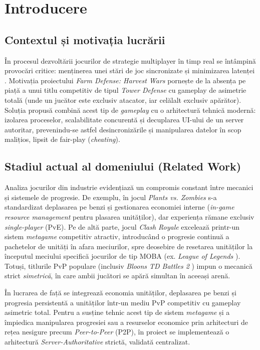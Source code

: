 \chapter{Introducere}
\label{ch:introducere}

\section{Contextul și motivația lucrării}
În procesul dezvoltării jocurilor de strategie multiplayer în timp real se întâmpină provocări critice: menținerea unei stări de joc sincronizate și minimizarea latenței \cite{glazer_multiplayer}. Motivația proiectului \textit{Farm Defense: Harvest Wars} pornește de la absența pe piață a unui titlu competitiv de tipul \textit{Tower Defense} cu gameplay de asimetrie totală (unde un jucător este exclusiv atacator, iar celălalt exclusiv apărător). Soluția propusă combină acest tip de \textit{gameplay} cu o arhitectură tehnică modernă: izolarea proceselor, scalabilitate concurentă și decuplarea UI-ului de un server autoritar, prevenindu-se astfel desincronizările și manipularea datelor în scop malițios, lipsit de fair-play (\textit{cheating}).

\section{Stadiul actual al domeniului (Related Work)}
Analiza jocurilor din industrie evidențiază un compromis constant între mecanici și sistemele de progresie. De exemplu, în jocul \textit{Plants vs. Zombies} \cite{pvz} s-a standardizat deplasarea pe benzi și gestionarea economiei interne (\textit{in-game resource management} pentru plasarea unităților), dar experiența rămane exclusiv \textit{single-player} (PvE). Pe de altă parte, jocul \textit{Clash Royale} \cite{clash_royale} excelează printr-un sistem \textit{metagame} competitiv atractiv, introducând o progresie continuă a pachetelor de unități în afara meciurilor, spre deosebire de resetarea unităților la începutul meciului specifică jocurilor de tip MOBA (ex. \textit{League of Legends} \cite{lol}). Totuși, titlurile PvP populare (inclusiv \textit{Bloons TD Battles 2} \cite{btdb2}) impun o mecanică strict \textit{simetrică}, în care ambii jucători se apără simultan în aceeași arenă.

În lucrarea de față se integrează economia unităților, deplasarea pe benzi și progresia persistentă a unităților într-un mediu PvP competitiv cu gameplay asimetric total. Pentru a susține tehnic acest tip de sistem \textit{metagame} și a împiedica manipularea progresiei sau a resurselor economice prin arhitecturi de rețea nesigure precum \textit{Peer-to-Peer} (P2P), în proiect se implementează o arhitectură \textit{Server-Authoritative} strictă, validată centralizat.


